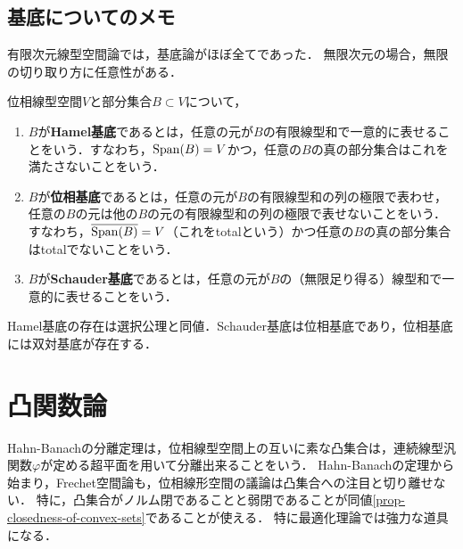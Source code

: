 \documentclass[uplatex,dvipdfmx]{jsreport}
\begin{document}
\subsection{基底についてのメモ}

\begin{tcolorbox}[colframe=ForestGreen, colback=ForestGreen!10!white,breakable,colbacktitle=ForestGreen!40!white,coltitle=black,fonttitle=\bfseries\sffamily,
title=]
    有限次元線型空間論では，基底論がほぼ全てであった．
    無限次元の場合，無限の切り取り方に任意性がある．
\end{tcolorbox}

\begin{definition}
    位相線型空間$V$と部分集合$B\subset V$について，
    \begin{enumerate}
        \item $B$が\textbf{Hamel基底}であるとは，任意の元が$B$の有限線型和で一意的に表せることをいう．すなわち，$\mathrm{Span}(B)=V$かつ，任意の$B$の真の部分集合はこれを満たさないことをいう．
        \item $B$が\textbf{位相基底}であるとは，任意の元が$B$の有限線型和の列の極限で表わせ，任意の$B$の元は他の$B$の元の有限線型和の列の極限で表せないことをいう．すなわち，$\overline{\mathrm{Span}(B)}=V$（これをtotalという）かつ任意の$B$の真の部分集合はtotalでないことをいう．
        \item $B$が\textbf{Schauder基底}であるとは，任意の元が$B$の（無限足り得る）線型和で一意的に表せることをいう．
    \end{enumerate}
\end{definition}
\begin{remarks}
    Hamel基底の存在は選択公理と同値．Schauder基底は位相基底であり，位相基底には双対基底が存在する．
\end{remarks}

\section{凸関数論}

\begin{tcolorbox}[colframe=ForestGreen, colback=ForestGreen!10!white,breakable,colbacktitle=ForestGreen!40!white,coltitle=black,fonttitle=\bfseries\sffamily,
title=凸解析の整備]
    Hahn-Banachの分離定理は，位相線型空間上の互いに素な凸集合は，連続線型汎関数$\varphi$が定める超平面を用いて分離出来ることをいう．
    Hahn-Banachの定理から始まり，Frechet空間論も，位相線形空間の議論は凸集合への注目と切り離せない．
    特に，凸集合がノルム閉であることと弱閉であることが同値\ref{prop-closedness-of-convex-sets}であることが使える．
    特に最適化理論では強力な道具になる．
\end{tcolorbox}
\end{document}
